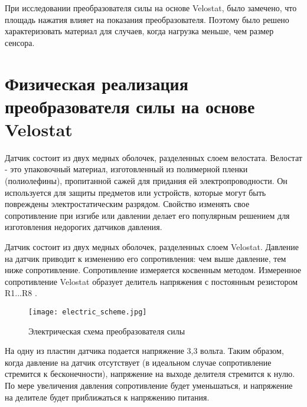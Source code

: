При исследовании преобразователя силы на основе Velostat, было замечено, что площадь нажатия влияет на показания преобразователя. Поэтому было решено характеризовать материал для случаев, когда нагрузка меньше, чем размер сенсора.

\section{Физическая реализация преобразователя силы на основе Velostat}

Датчик состоит из двух медных оболочек, разделенных слоем велостата. Велостат - это упаковочный материал, изготовленный из полимерной пленки (полиолефины), пропитанной сажей для придания ей электропроводности. Он используется для защиты предметов или устройств, которые могут быть повреждены электростатическим разрядом. Свойство изменять свое сопротивление при изгибе или давлении делает его популярным решением для изготовления недорогих датчиков давления.

Датчик состоит из двух медных оболочек, разделенных слоем Velostat. Давление на датчик приводит к изменению его сопротивления: чем выше давление, тем ниже сопротивление. Сопротивление измеряется косвенным методом. Измеренное сопротивление Velostat образует делитель напряжения с постоянным резистором R1...R8 .


\begin{figure}[H]
\centering\texttt{[image: electric\_scheme.jpg]}\\
\caption{Электрическая схема преобразователя силы}
\label{fig:el_scheme}
\end{figure}

На одну из пластин датчика подается напряжение 3,3 вольта. Таким образом, когда давление на датчик отсутствует (в идеальном случае сопротивление стремится к бесконечности), напряжение на выходе делителя стремится к нулю. По мере увеличения давления сопротивление будет уменьшаться, и напряжение на делителе будет приближаться к напряжению питания.


